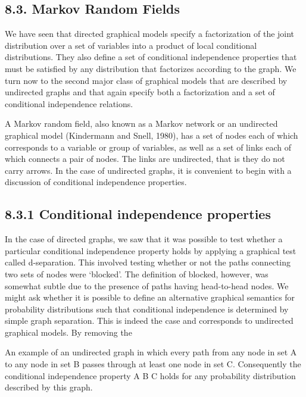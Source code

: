 \documentclass[
  10
]{article}
\begin{document}
\subsection{8.3. Markov Random Fields}\label{markov-random-fields}

We have seen that directed graphical models specify a factorization of
the joint distribution over a set of variables into a product of local
conditional distributions. They also define a set of conditional
independence properties that must be satisfied by any distribution that
factorizes according to the graph. We turn now to the second major class
of graphical models that are described by undirected graphs and that
again specify both a factorization and a set of conditional independence
relations.

A Markov random field, also known as a Markov network or an undirected
graphical model (Kindermann and Snell, 1980), has a set of nodes each of
which corresponds to a variable or group of variables, as well as a set
of links each of which connects a pair of nodes. The links are
undirected, that is they do not carry arrows. In the case of undirected
graphs, it is convenient to begin with a discussion of conditional
independence properties.

\subsection{8.3.1 Conditional independence
properties}\label{conditional-independence-properties}

In the case of directed graphs, we saw that it was possible to test
whether a particular conditional independence property holds by applying
a graphical test called d-separation. This involved testing whether or
not the paths connecting two sets of nodes were `blocked'. The
definition of blocked, however, was somewhat subtle due to the presence
of paths having head-to-head nodes. We might ask whether it is possible
to define an alternative graphical semantics for probability
distributions such that conditional independence is determined by simple
graph separation. This is indeed the case and corresponds to undirected
graphical models. By removing the

An example of an undirected graph in which every path from any node in
set A to any node in set B passes through at least one node in set C.
Consequently the conditional independence property A B C holds for any
probability distribution described by this graph.
\end{document}
